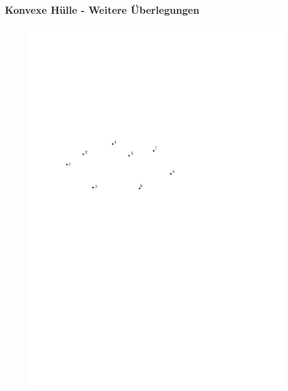 \begin{frame}
	\frametitle{{Konvexe Hülle - Weitere Überlegungen}}
\begin{figure}[htbp]
	\begin{center}
  	\includegraphics[width=.8\linewidth]{bilder/graham1}
	\end{center}
\end{figure}
\end{frame}


